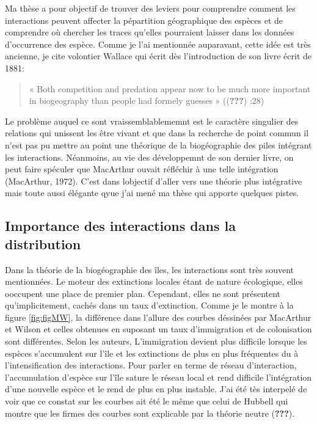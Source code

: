Ma thèse a pour objectif de trouver des leviers pour comprendre comment
les interactions peuvent affecter la pépartition géographique des
espèces et de comprendre où chercher les traces qu'elles pourraient
laisser dans les données d'occurrence des espèce. Comme je l'ai
mentionnée auparavant, cette idée est très ancienne, je cite volontier
Wallace qui écrit dès l'introduction de son livre écrit de 1881:

\begin{quote}
« Both competition and predation appear now to be much more important in
biogeography than people had formely guesses » (({\textbf{???}}) :28)
\end{quote}

Le problème auquel ce sont vraissemblablememnt est le caractère
singulier des relations qui unissent les être vivant et que dans la
recherche de point commun il n'est pas pu mettre au point une théorique
de la biogéographie des piles intégrant les interactions. Néanmoins, au
vie des développemnt de son dernier livre, on peut faire spéculer que
MacArthur ouvait réfléchir à une telle intégration (MacArthur, 1972).
C'est dans lobjectif d'aller vers une théorie plus intégrative mais
toute aussi élégante qyue j'ai mené ma thèse qui apporte quelques
pistes.

\subsection*{Importance des interactions dans la
distribution}\label{importance-des-interactions-dans-la-distribution}

Dans la théorie de la biogéographie des îles, les interactions sont très
souvent mentionnées. Le moteur des extinctions locales étant de nature
écologique, elles ooccupent une place de premier plan. Cependant, elles
ne sont présentent qu'implicitement, cachés dans un taux d'extinction.
Comme je le montre à la figure \ref{fig:figMW}, la différence dans
l'allure des courbes déssinées par MacArthur et Wilson et celles
obtenues en suposant un taux d'immigration et de colonisation sont
différentes. Selon les auteurs, L'immigration devient plus difficile
lorsque les espèces s'accumulent sur l'île et les extinctions de plus en
plus fréquentes du à l'intensification des interactions. Pour parler en
terme de réseau d'interaction, l'accumulation d'espèce sur l'île sature
le réseau local et rend difficile l'intégration d'une nouvelle espèce et
le rend de plus en plus instable. J'ai été tès interpelé de voir que ce
constat sur les courbes ait été le même que celui de Hubbell qui montre
que les firmes des courbes sont explicable par la théorie neutre
({\textbf{???}}).

